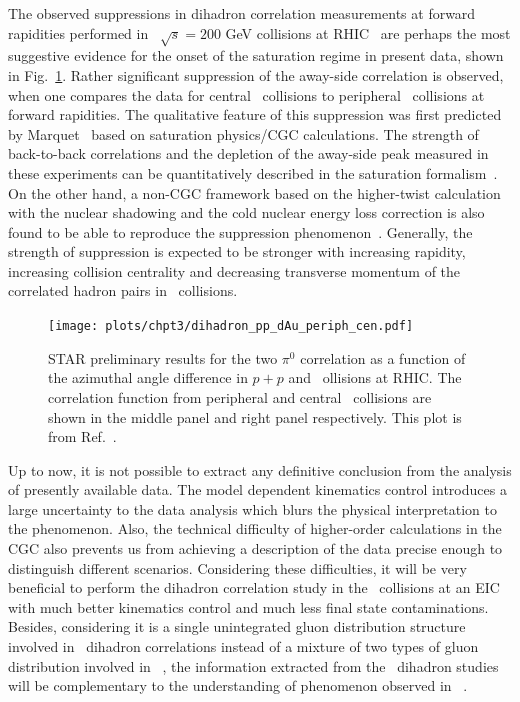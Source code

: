 The observed suppressions in dihadron correlation measurements at forward
rapidities performed in \dA\ $\sqrt{s}=200$ GeV collisions at
RHIC~\cite{Adare:2011sc,Braidot:2010ig,Li:2012bn} are perhaps the most
suggestive evidence for the onset of the saturation regime in present data, shown
in Fig.~\ref{fig:dihadron_dAu}. Rather significant suppression of the away-side
correlation is observed, when one compares the data for central \dA\ collisions
to peripheral \dA\ collisions at forward rapidities. The qualitative feature of
this suppression was first predicted by Marquet~\cite{Marquet:2007vb} based on
saturation physics/CGC calculations. The strength of back-to-back correlations
and the depletion of the away-side peak measured in these experiments can be
quantitatively described in the saturation
formalism~\cite{Albacete:2010pg,Stasto:2011ru,Lappi:2012nh}. On the other hand,
a non-CGC framework based on the higher-twist calculation with the nuclear shadowing and the
cold nuclear energy loss correction is also found to be able to reproduce the
suppression phenomenon~\cite{Kang:2011bp}. Generally, the strength of suppression
is expected to be stronger with increasing rapidity, increasing collision centrality
and decreasing transverse momentum of the correlated hadron pairs in \dA\ collisions.

\begin{figure}
\centering
\texttt{[image: plots/chpt3/dihadron\_pp\_dAu\_periph\_cen.pdf]}
\caption[Conditional yield of dihadron correlations in $d+$Au collisions at STAR]{
STAR preliminary results for the two $\pi^{0}$ correlation as a function of the
azimuthal angle difference in $p+p$ and \dA\ ollisions at RHIC. The correlation
function from peripheral and central \dA\ collisions are shown in the middle panel and right
panel respectively.
This plot is from Ref.~\cite{Braidot:2010ig}.}
\label{fig:dihadron_dAu}
\end{figure}

Up to now, it is not possible to extract any definitive conclusion from the
analysis of presently available data. The model dependent kinematics control
introduces a large uncertainty to the data analysis which blurs the
physical interpretation to the phenomenon. Also, the technical difficulty of
higher-order calculations in the CGC also prevents us from achieving a
description of the data precise enough to distinguish different scenarios.
Considering these difficulties, it will be very beneficial to perform the
dihadron correlation study in the \eA\ collisions at an EIC with much better
kinematics control and much less final state contaminations. Besides,
considering it is a single unintegrated gluon distribution structure involved in
\eA\ dihadron correlations instead of a mixture of two types of gluon distribution
involved in \dA\ , the information extracted from the \eA\ dihadron studies will
be complementary to the understanding of phenomenon observed in \dA\ .



